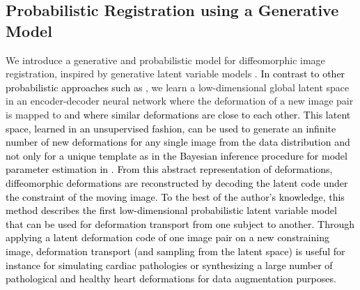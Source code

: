 \documentclass[journal]{IEEEtran}
\newcommand{\update}[1]{\textcolor{black}{#1}}
\begin{document}
\subsection{Probabilistic Registration using a Generative Model}
We introduce a generative and probabilistic model for diffeomorphic image registration, inspired by generative latent variable models \cite{kingma2013auto,kingma2014semi}. \update{In contrast to other probabilistic approaches such as \cite{yang2017quicksilver,dalca2018unsupervised}}, we learn a low-dimensional global latent space in an encoder-decoder neural network where the deformation of a new image pair is mapped to \update{and where similar deformations are close to each other. This latent space, learned in an unsupervised fashion, can be used to generate an infinite number of new deformations for any single image from the data distribution and not only for a unique template as in the Bayesian inference procedure for model parameter estimation in \cite{zhang2014bayesian}. From this abstract representation of deformations, diffeomorphic deformations are reconstructed by decoding the latent code under the constraint of the moving image. To the best of the author's knowledge, this method describes the first low-dimensional probabilistic latent variable model that can be used for deformation transport from one subject to another. Through applying a latent deformation code of one image pair on a new constraining image, deformation transport (and sampling from the latent space) is useful for instance for simulating cardiac pathologies or synthesizing a large number of pathological and healthy heart deformations for data augmentation purposes.} 
\end{document}
